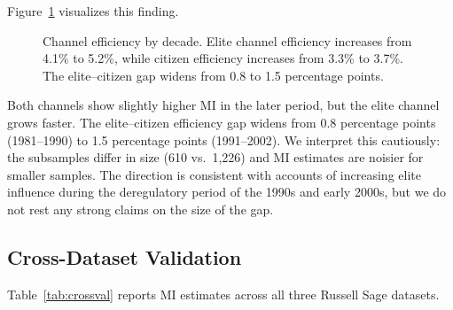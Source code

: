 \documentclass[twocolumn,10pt]{article}
\begin{document}
Figure~\ref{fig:temporal} visualizes this finding.

\begin{figure}[t]
\centering
{}
\caption{Channel efficiency by decade.  Elite channel efficiency increases from 4.1\% to 5.2\%, while citizen efficiency increases from 3.3\% to 3.7\%.  The elite--citizen gap widens from 0.8 to 1.5 percentage points.}
\label{fig:temporal}
\end{figure}

Both channels show slightly higher MI in the later period, but the elite channel grows faster.  The elite--citizen efficiency gap widens from 0.8 percentage points (1981--1990) to 1.5 percentage points (1991--2002).  We interpret this cautiously: the subsamples differ in size (610 vs.\ 1,226) and MI estimates are noisier for smaller samples.  The direction is consistent with accounts of increasing elite influence during the deregulatory period of the 1990s and early 2000s, but we do not rest any strong claims on the size of the gap.

\subsection{Cross-Dataset Validation}

Table~\ref{tab:crossval} reports MI estimates across all three Russell Sage datasets.
\end{document}
